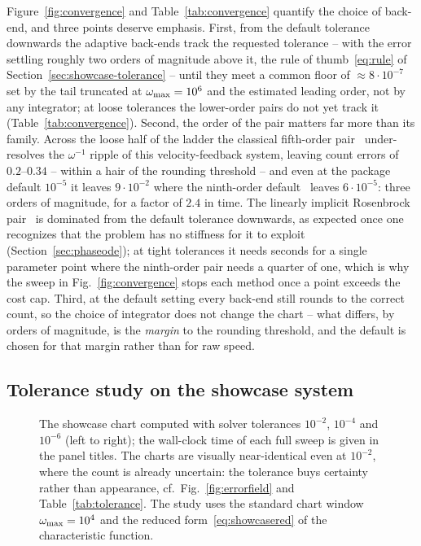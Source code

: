 Figure~\ref{fig:convergence} and Table~\ref{tab:convergence} quantify the
choice of back-end, and three points deserve emphasis. First, from the
default tolerance downwards the adaptive back-ends track the requested
tolerance -- with the error settling roughly two orders of magnitude above
it, the rule of thumb~\eqref{eq:rule} of Section~\ref{sec:showcase-tolerance}
-- until they meet a common floor of $\approx8\cdot10^{-7}$ set by the tail
truncated at $\omega_{\mathrm{max}}=10^{6}$ and the estimated leading order, not by any
integrator; at loose tolerances the lower-order pairs do not yet track it
(Table~\ref{tab:convergence}). Second, the order of the pair matters far more
than its family.
Across the loose half of the ladder the classical fifth-order
pair~\cite{tsitouras2011runge} under-resolves the $\omega^{-1}$ ripple of
this velocity-feedback system, leaving count errors of $0.2$--$0.34$ --
within a hair of the rounding threshold -- and even at the package default
$10^{-5}$ it leaves $9\cdot10^{-2}$ where the ninth-order
default~\cite{verner2010numerically} leaves $6\cdot10^{-5}$: three orders
of magnitude, for a factor of $2.4$ in time. The linearly implicit
Rosenbrock
pair~\cite{rosenbrock1963some,shampine1997matlab,hairer1996solving} is
dominated from the default tolerance downwards, as
expected once one recognizes that the problem has no stiffness for it to
exploit (Section~\ref{sec:phaseode}); at tight tolerances it needs seconds
for a single parameter point where the ninth-order pair needs a quarter of
one, which is why the sweep in Fig.~\ref{fig:convergence} stops each method
once a point exceeds the cost cap. Third, at the default setting every
back-end still rounds to the correct count, so the choice of integrator
does not change the chart -- what differs, by orders of magnitude, is the
\emph{margin} to the rounding threshold, and the default is chosen for that
margin rather than for raw speed.


\subsection{Tolerance study on the showcase system}\label{app:tolerance}


\begin{figure}[tb]
  \centering
  \caption{The showcase chart computed with solver tolerances
  $10^{-2}$, $10^{-4}$ and $10^{-6}$ (left to right); the
  wall-clock time of each full sweep is given in the panel titles. The charts
  are visually near-identical even at $10^{-2}$, where the count is already
  uncertain: the tolerance buys certainty rather than appearance, cf.\
  Fig.~\ref{fig:errorfield} and Table~\ref{tab:tolerance}. The study uses
  the standard chart window $\omega_{\mathrm{max}}=10^{4}$ and the reduced
  form~\eqref{eq:showcasered} of the characteristic
  function.}\label{fig:tolerance}
\end{figure}

